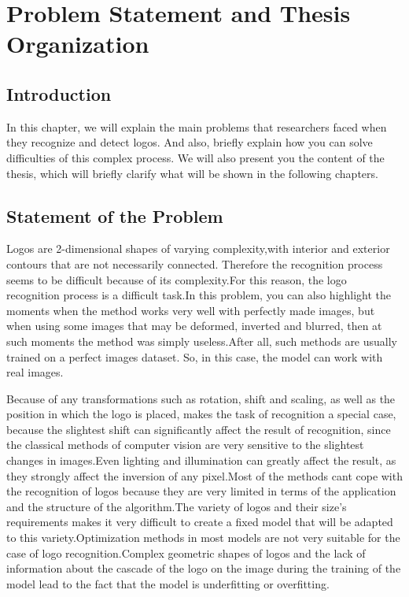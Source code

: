 \chapter{Problem Statement and Thesis Organization}\label{ch:B}
\section{Introduction}\label{sec:2.1}
\par In this chapter, we will explain the main problems that researchers faced when they recognize and detect logos. And also, briefly explain how you can solve difficulties of this complex process. We will also present you the content of the thesis, which will briefly clarify what will be shown in the following chapters.


\vspace{-0.3cm}


\section{Statement of the Problem}\label{sec:2.2}

\par  Logos are 2-dimensional shapes of varying complexity,with interior and exterior contours that are not necessarily connected. Therefore the recognition process seems to be difficult because of its complexity.For this reason, the logo recognition process is a difficult task.In this problem, you can also highlight the moments when the method works very well with perfectly made images, but when using some images that may be deformed, inverted and blurred, then at such moments the method was simply useless.After all, such methods are usually trained on a perfect images dataset. So, in this case, the model can work with real images.\cite{noisy}

\par Because of any transformations such as rotation, shift and scaling, as well as the position in which the logo is placed, makes the task of recognition a special case, because the slightest shift can significantly affect the result of recognition, since the classical methods of computer vision are very sensitive to the slightest changes in images.Even lighting and illumination can greatly affect the result, as they strongly affect the inversion of any pixel.Most of the methods cant cope with the recognition of logos because they are very limited in terms of the application and the structure of the algorithm.The variety of logos and their size's requirements makes it very difficult to create a fixed model that will be adapted to this variety.Optimization methods in most models are not very suitable for the case of logo recognition.Complex geometric shapes of logos and the lack of information about the cascade of the logo on the image during the training of the model lead to the fact that the model is underfitting or overfitting.\cite{explot}


